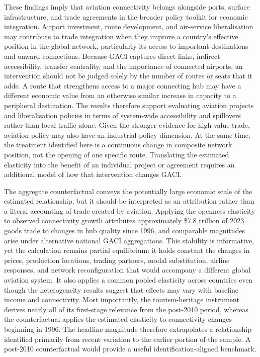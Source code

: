 These findings imply that aviation connectivity belongs alongside ports,
surface infrastructure, and trade agreements in the broader policy toolkit
for economic integration. Airport investment, route development, and
air-service liberalisation may contribute to trade integration when they
improve a country's effective position in the global network, particularly
its access to important destinations and onward connections. Because GACI
captures direct links, indirect accessibility, transfer centrality, and the
importance of connected airports, an intervention should not be judged solely
by the number of routes or seats that it adds. A route that strengthens
access to a major connecting hub may have a different economic value from an
otherwise similar increase in capacity to a peripheral destination. The
results therefore support evaluating aviation projects and liberalisation
policies in terms of system-wide accessibility and spillovers rather than
local traffic alone. Given the stronger evidence for high-value trade,
aviation policy may also have an industrial-policy dimension. At the same
time, the treatment identified here is a continuous change in composite
network position, not the opening of one specific route. Translating the
estimated elasticity into the benefit of an individual project or agreement
requires an additional model of how that intervention changes GACI.

The aggregate counterfactual conveys the potentially large economic scale of
the estimated relationship, but it should be interpreted as an attribution
rather than a literal accounting of trade created by aviation. Applying the
openness elasticity to observed connectivity growth attributes approximately
\$7.8 trillion of 2023 goods trade to changes in hub quality since 1996, and
comparable magnitudes arise under alternative national GACI aggregations.
This stability is informative, yet the calculation remains partial
equilibrium: it holds constant the changes in prices, production locations,
trading partners, modal substitution, airline responses, and network
reconfiguration that would accompany a different global aviation system. It
also applies a common pooled elasticity across countries even though the
heterogeneity results suggest that effects may vary with baseline income and
connectivity. Most importantly, the tourism-heritage instrument derives
nearly all of its first-stage relevance from the post-2010 period, whereas
the counterfactual applies the estimated elasticity to connectivity changes
beginning in 1996. The headline magnitude therefore extrapolates a
relationship identified primarily from recent variation to the earlier
portion of the sample. A post-2010 counterfactual would provide a useful
identification-aligned benchmark.


